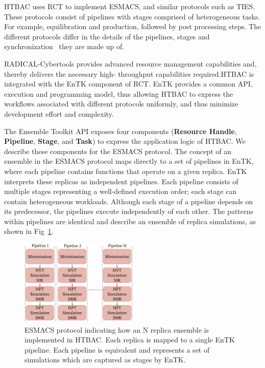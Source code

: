 
HTBAC uses RCT to implement ESMACS, and similar
protocols such as TIES\@. These protocols consist of pipelines with stages
comprised of heterogeneous tasks. For example, equilibration and production,
followed by post processing steps. The different protocols differ in the details of the pipelines, stages and
synchronization~\cite{Bhati2017} they are made up of.


RADICAL-Cybertools provides advanced resource management capabilities and,
thereby delivers the necessary high- throughput capabilities required.HTBAC is
integrated with the EnTK component of RCT. EnTK provides a common API,
execution and programming model, thus allowing HTBAC to express the workflows
associated with different protocols uniformly, and thus minimize development
effort and complexity.

The Ensemble Toolkit API exposes four components (\textbf{Resource Handle},
\textbf{Pipeline}, \textbf{Stage}, and \textbf{Task}) to express the
application logic of HTBAC\@. We describe these components for the ESMACS
protocol\@. The concept of an ensemble in the ESMACS protocol maps directly to
a set of pipelines in EnTK, where each pipeline contains functions that operate
on a given replica. EnTK interprets these replicas as independent pipelines.
Each pipeline consists of multiple stages representing a well-defined execution
order; each stage can contain heterogeneous workloads. Although each stage of a
pipeline depends on its predecessor, the pipelines execute independently of each
other. The patterns within pipelines are identical and describe an ensemble of replica
simulations, as shown in Fig~\ref{figure:ESMACS-pipelines}.


\begin{figure}
\centering
  \includegraphics[width=0.5\textwidth]{FIGURES/HT-BAC_NAMD_pipelines_control_flow_only.pdf}
  \caption{ESMACS protocol indicating how an N replica ensemble is implemented in HTBAC.
  Each replica is mapped to a single EnTK pipeline.
  Each pipeline is equivalent and represents a set of simulations which are captured as stages by
  EnTK.}\label{figure:ESMACS-pipelines}
\end{figure}


